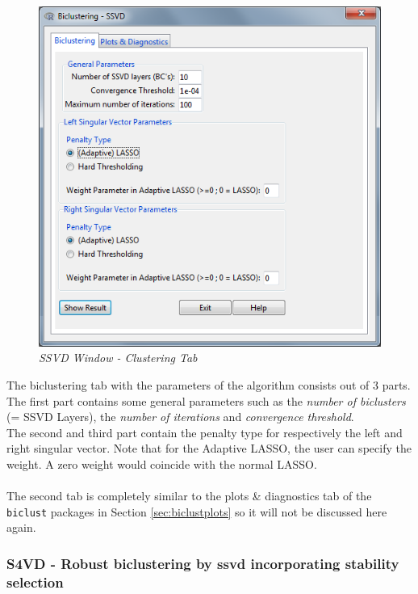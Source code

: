 \documentclass[a4paper]{article}\usepackage[]{graphicx}\usepackage[]{color}
\begin{document}
\begin{figure}[H]
\centering
\includegraphics[scale=0.5]{figures/ssvd_clusttab.png}
\caption{{\it SSVD Window - Clustering Tab}\label{ssvd_clusttab}}
\end{figure}
\noindent The biclustering tab with the parameters of the algorithm consists out
of 3 parts. The first part contains some general parameters such as the {\it
number of biclusters} (= SSVD Layers), the {\it number of iterations} and {\it
convergence threshold}.\\
The second and third part contain the penalty type for respectively the left and
right singular vector. Note that for the Adaptive LASSO, the user can specify
the weight. A zero weight would coincide with the normal LASSO.
\\ \\
The second tab is completely similar to the plots \& diagnostics tab of the
\texttt{biclust} packages in Section \ref{sec:biclustplots} so it will not be
discussed here again.

\subsubsection{S4VD - Robust biclustering by ssvd incorporating stability
selection}
\end{document}

